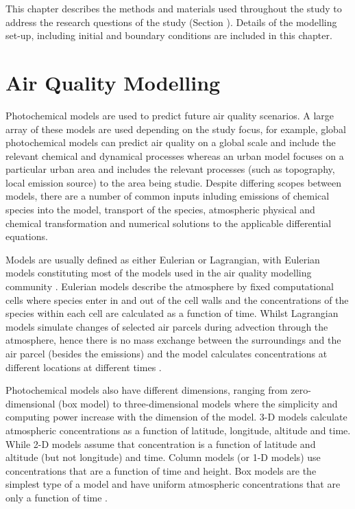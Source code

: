 This chapter describes the methods and materials used throughout the study to address the research questions of the study (Section ).
Details of the modelling set-up, including initial and boundary conditions are included in this chapter.

\section{Air Quality Modelling} \label{s:modelling}

Photochemical models are used to predict future air quality scenarios.
A large array of these models are used depending on the study focus, for example, global photochemical models can predict air quality on a global scale and include the relevant chemical and dynamical processes whereas an urban model focuses on a particular urban area and includes the relevant processes (such as topography, local emission source) to the area being studie.
Despite differing scopes between models, there are a number of common inputs inluding emissions of chemical species into the model, transport of the species, atmospheric physical and chemical transformation and numerical solutions to the applicable differential equations.

Models are usually defined as either Eulerian or Lagrangian, with Eulerian models constituting most of the models used in the air quality modelling community \citep{Russell:2000}.
Eulerian models describe the atmosphere by fixed computational cells where species enter in and out of the cell walls and the concentrations of the species within each cell are calculated as a function of time. 
Whilst Lagrangian models simulate changes of selected air parcels during advection through the atmosphere, hence there is no mass exchange between the surroundings and the air parcel (besides the emissions) and the model calculates concentrations at different locations at different times \citep{Seinfeld:2006}. 

Photochemical models also have different dimensions, ranging from zero-dimensional (box model) to three-dimensional models where the simplicity and computing power increase with the dimension of the model.
3-D models calculate atmospheric concentrations as a function of latitude, longitude, altitude and time. 
While 2-D models assume that concentration is a function of latitude and altitude (but not longitude) and time.
Column models (or 1-D models) use concentrations that are a function of time and height.
Box models are the simplest type of a model and have uniform atmospheric concentrations that are only a function of time \citep{Seinfeld:2006}.

